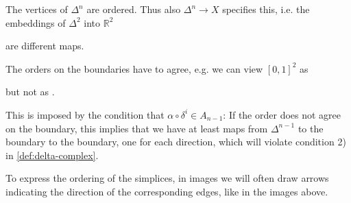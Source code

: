 

\begin{remark*}
    The vertices of $\Delta^n$ are ordered. Thus also $\Delta^n \to X$ specifies this, i.e. the embeddings of $\Delta^2$ into $\mathbb{R}^2$

    are different maps.

    The orders on the boundaries have to agree, e.g. we can view $[0,1]^2$ as


    but not as
    .

    This is imposed by the condition that $α \circ  δ^i \in A_{n-1}$: If the order does not agree on the boundary, this implies that we have at least maps from $\Delta^{n-1}$ to the boundary to the boundary, one for each direction, which will violate condition 2) in \autoref{def:delta-complex}.

    To express the ordering of the simplices, in images we will often draw arrows indicating the direction of the corresponding edges, like in the images above.
\end{remark*}

